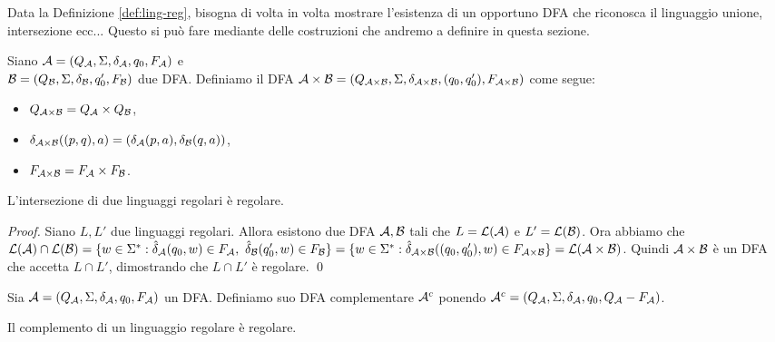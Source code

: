 \documentclass[runningheads,a4paper]{llncs}
\begin{document}
Data la Definizione \ref{def:ling-reg}, bisogna di volta in volta mostrare l'esistenza di un opportuno DFA che riconosca il linguaggio unione, intersezione ecc... Questo si pu\`{o} fare mediante delle costruzioni che andremo a definire in questa sezione.

\begin{definition}\label{def:prod-DFA}
Siano $\mathcal{A} = (Q_{\mathcal{A}},\Sigma,\delta_{\mathcal{A}},q_0,F_{\mathcal{A}})$ e \\ $\mathcal{B} = (Q_{\mathcal{B}},\Sigma,\delta_{\mathcal{B}},q_0',F_{\mathcal{B}})$ due DFA. Definiamo il DFA $\mathcal{A} \times \mathcal{B}= (Q_{\mathcal{A} \times \mathcal{B}},\Sigma,\delta_{\mathcal{A} \times \mathcal{B}},(q_0,q_0'),F_{\mathcal{A} \times \mathcal{B}})$ come segue:
\begin{itemize}
\item $Q_{\mathcal{A} \times \mathcal{B}} = Q_{\mathcal{A}} \times Q_{\mathcal{B}}$,
\item $\delta_{\mathcal{A} \times \mathcal{B}}((p,q),a) = (\delta_{\mathcal{A}}(p,a),\delta_{\mathcal{B}}(q,a))$,
\item $F_{\mathcal{A} \times \mathcal{B}} = F_{\mathcal{A}} \times F_{\mathcal{B}}$.
\end{itemize}
\end{definition}

\begin{theorem}[Intersezione]\label{thm:prod-DFA}
L'intersezione di due linguaggi regolari \`{e} regolare.
\end{theorem}

\begin{proof}
Siano $L,L'$ due linguaggi regolari. Allora esistono due DFA $\mathcal{A},\mathcal{B}$ tali che $L = \mathcal{L}(\mathcal{A})$ e $L' = \mathcal{L}(\mathcal{B})$. Ora abbiamo che $\mathcal{L}(\mathcal{A}) \cap \mathcal{L}(\mathcal{B})= \{w \in \Sigma^* : \hat{\delta}_{\mathcal{A}}(q_0,w) \in F_{\mathcal{A}},\ \hat{\delta}_{\mathcal{B}}(q_0',w) \in F_{\mathcal{B}}\} = \{w \in \Sigma^* : \hat{\delta}_{\mathcal{A} \times \mathcal{B}}((q_0,q_0'),w) \in F_{\mathcal{A}\times \mathcal{B}}\} = \mathcal{L}(\mathcal{A} \times \mathcal{B})$. Quindi $\mathcal{A}\times\mathcal{B}$ \`{e} un DFA che accetta $L \cap L'$, dimostrando che $L \cap L'$ \`{e} regolare.
\qed\end{proof}

\begin{definition}\label{def:compl-DFA}
Sia $\mathcal{A} = (Q_{\mathcal{A}},\Sigma,\delta_{\mathcal{A}},q_0,F_{\mathcal{A}})$ un DFA. Definiamo suo DFA complementare $\mathcal{A}^c$ ponendo $\mathcal{A}^c = (Q_{\mathcal{A}},\Sigma,\delta_{\mathcal{A}},q_0,Q_{\mathcal{A}}-F_{\mathcal{A}})$.
\end{definition}

\begin{theorem}[Complemento]\label{thm:compl-DFA}
Il complemento di un linguaggio regolare \`{e} regolare.
\end{theorem}
\end{document}

